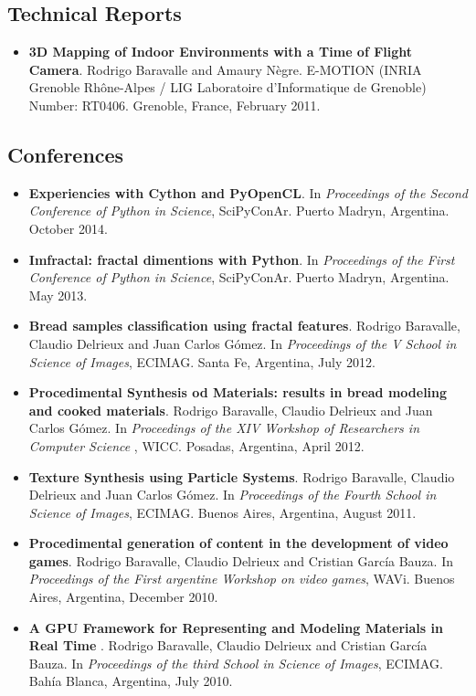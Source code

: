 \documentclass[a4paper,12pt]{article}
\begin{document}
\subsection*{\color{niceblue} Technical Reports}
\begin{itemize}
\item {\bf 3D Mapping of Indoor Environments with a Time of Flight Camera}. Rodrigo Baravalle and Amaury N\`egre. E-MOTION (INRIA Grenoble Rh\^one-Alpes / LIG Laboratoire d'Informatique de Grenoble) Number: RT0406. Grenoble, France, February 2011.
\end{itemize}

\subsection*{\color{niceblue} Conferences}
\begin{itemize}
\item {\bf Experiencies with Cython and PyOpenCL}. In {\it Proceedings of the Second Conference of Python in Science}, SciPyConAr. Puerto Madryn, Argentina. October 2014.
\item {\bf Imfractal: fractal dimentions with Python}.  In {\it Proceedings of the First Conference of Python in Science}, SciPyConAr. Puerto Madryn, Argentina. May 2013.
\item {\bf Bread samples classification using fractal features}. Rodrigo Baravalle, Claudio Delrieux and Juan Carlos G\'omez. In {\it Proceedings of the V School in Science of Images}, ECIMAG. Santa Fe, Argentina, July 2012.
\item {\bf Procedimental Synthesis od Materials: results in bread modeling and cooked materials}. Rodrigo Baravalle, Claudio Delrieux and Juan Carlos G\'omez. In {\it Proceedings of the XIV Workshop of Researchers in Computer Science }, WICC. Posadas, Argentina, April 2012.
\item {\bf Texture Synthesis using Particle Systems}. Rodrigo Baravalle, Claudio Delrieux and Juan Carlos G\'omez. In {\it Proceedings of the Fourth School in Science of Images}, ECIMAG. Buenos Aires, Argentina, August 2011.
\item {\bf Procedimental generation of content in the development of video games}. Rodrigo Baravalle, Claudio Delrieux and Cristian Garc\'ia Bauza. In {\it Proceedings of the First argentine Workshop on video games}, WAVi. Buenos Aires, Argentina, December 2010.
\item {\bf A GPU Framework for Representing and Modeling Materials in Real Time }. Rodrigo Baravalle, Claudio Delrieux and Cristian Garc\'ia Bauza. In {\it Proceedings of the third School in Science of Images}, ECIMAG. Bahía Blanca, Argentina, July 2010.
\end{itemize}
\end{document}

